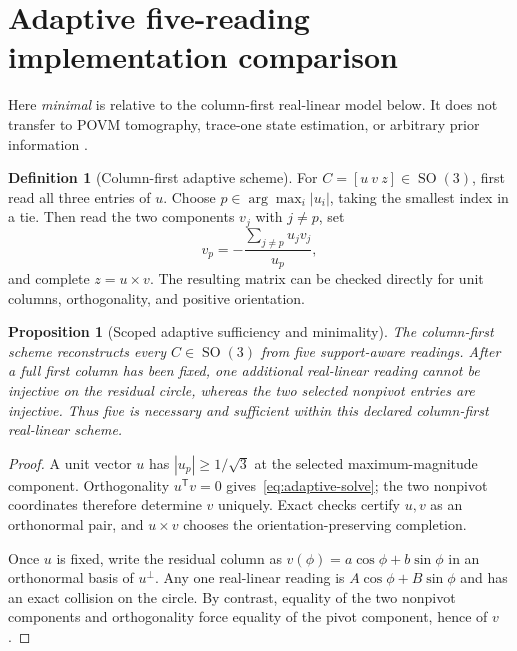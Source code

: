 \documentclass[12pt]{article}
\newtheorem{proposition}[theorem]{Proposition}
\theoremstyle{definition}
\newtheorem{definition}[theorem]{Definition}
\theoremstyle{remark}
\newcommand{\SO}{\operatorname{SO}}
\begin{document}
\section{Adaptive five-reading implementation comparison}
\label{sec:adaptive_comparison}

Here \emph{minimal} is relative to the column-first real-linear model below.
It does not transfer to POVM tomography, trace-one state estimation, or
arbitrary prior information
\cite{RehacekEtAl2004,HeinosaariMazzarellaWolf2013}.

\begin{definition}[Column-first adaptive scheme]\label{def:adaptive-protocol}
For $C=[u\ v\ z]\in\SO(3)$, first read all three entries of $u$.  Choose
$p\in\arg\max_i|u_i|$, taking the smallest index in a tie.  Then read the two components $v_j$ with
$j\ne p$, set
\begin{equation}\label{eq:adaptive-solve}
 v_p=-\frac{\sum_{j\ne p}u_jv_j}{u_p},
\end{equation}
 and complete $z=u\times v$.  The resulting matrix can be checked directly
 for unit columns, orthogonality, and positive orientation.
\end{definition}

\begin{proposition}[Scoped adaptive sufficiency and minimality]
\label{prop:adaptive-five}
The column-first scheme reconstructs every $C\in\SO(3)$ from five
support-aware readings.  After a full first column has been fixed, one
additional real-linear reading cannot be injective on the residual circle,
whereas the two selected nonpivot entries are injective.  Thus five is
necessary and sufficient within this declared column-first real-linear
scheme.
\end{proposition}

\begin{proof}
A unit vector $u$ has $|u_p|\geq1/\sqrt3$ at the selected
maximum-magnitude component.  Orthogonality
$u^\mathsf Tv=0$ gives~\eqref{eq:adaptive-solve}; the two nonpivot
coordinates therefore determine $v$ uniquely.  Exact checks certify
$u,v$ as an orthonormal pair, and $u\times v$ chooses the
orientation-preserving completion.

Once $u$ is fixed, write the residual column as
$v(\phi)=a\cos\phi+b\sin\phi$ in an orthonormal basis of $u^\perp$.  Any
one real-linear reading is $A\cos\phi+B\sin\phi$ and has an exact collision
on the circle.  By contrast, equality of the two nonpivot components and
orthogonality force equality of the pivot component, hence of $v$.
\end{proof}
\end{document}
